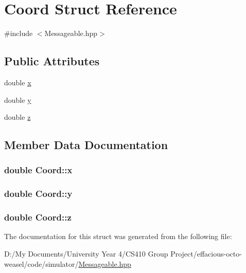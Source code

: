 \hypertarget{struct_coord}{}\section{Coord Struct Reference}
\label{struct_coord}


{\ttfamily \#include $<$Messageable.\+hpp$>$}

\subsection*{Public Attributes}
\begin{DoxyCompactItemize}
\item 
double \hyperlink{struct_coord_a0172a22ee75843a96e3a84ebc25f3de7}{x}
\item 
double \hyperlink{struct_coord_af6e543e0522076e717bae53102655b87}{y}
\item 
double \hyperlink{struct_coord_a2bf056108a79437171f18490afbdce2d}{z}
\end{DoxyCompactItemize}


\subsection{Member Data Documentation}
\subsubsection[{\texorpdfstring{x}{x}}]{\setlength{\rightskip}{0pt plus 5cm}double Coord\+::x}\hypertarget{struct_coord_a0172a22ee75843a96e3a84ebc25f3de7}{}\label{struct_coord_a0172a22ee75843a96e3a84ebc25f3de7}
\subsubsection[{\texorpdfstring{y}{y}}]{\setlength{\rightskip}{0pt plus 5cm}double Coord\+::y}\hypertarget{struct_coord_af6e543e0522076e717bae53102655b87}{}\label{struct_coord_af6e543e0522076e717bae53102655b87}
\subsubsection[{\texorpdfstring{z}{z}}]{\setlength{\rightskip}{0pt plus 5cm}double Coord\+::z}\hypertarget{struct_coord_a2bf056108a79437171f18490afbdce2d}{}\label{struct_coord_a2bf056108a79437171f18490afbdce2d}


The documentation for this struct was generated from the following file\+:\begin{DoxyCompactItemize}
\item 
D\+:/\+My Documents/\+University Year 4/\+C\+S410 Group Project/effacious-\/octo-\/weasel/code/simulator/\hyperlink{_messageable_8hpp}{Messageable.\+hpp}\end{DoxyCompactItemize}
